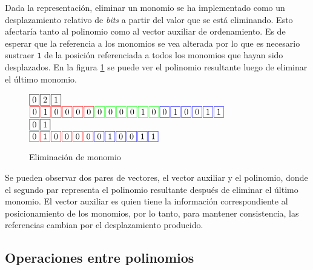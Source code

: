 Dada la representación, eliminar un monomio se ha implementado como un desplazamiento relativo de \textit{bits} a partir del valor que se está eliminando. Esto afectaría tanto al polinomio como al vector auxiliar de ordenamiento. Es de esperar que la referencia a los monomios se vea alterada por lo que es necesario sustraer \texttt{1} de la posición referenciada a todos los monomios que hayan sido desplazados. En la figura \ref{fig:p_e} se puede ver el polinomio resultante luego de eliminar el último monomio.

\begin{figure}
    \centering
    \begin{minipage}[c][3.5cm][b]{.65\textwidth}
    \noindent
    $\fbox{0} \hspace*{.1em} \fbox{2} \hspace*{.1em} \fbox{1}$\ \\
    \noindent
    $\fcolorbox{red}{white}{0} \sep \fcolorbox{red}{white}{1} \sep \fcolorbox{red}{white}{0} \sep \fcolorbox{red}{white}{0} \sep \fcolorbox{red}{white}{0} \sep \fcolorbox{red}{white}{0} \sep \fcolorbox{green}{white}{0} \sep \fcolorbox{green}{white}{0} \sep \fcolorbox{green}{white}{0} \sep \fcolorbox{green}{white}{0} \sep \fcolorbox{green}{white}{1} \sep \fcolorbox{green}{white}{0} \sep \fcolorbox{blue}{white}{0} \sep \fcolorbox{blue}{white}{1} \sep \fcolorbox{blue}{white}{0} \sep \fcolorbox{blue}{white}{0} \sep \fcolorbox{blue}{white}{1} \sep \fcolorbox{blue}{white}{1}$\ \\
    \noindent
    $\fbox{0} \hspace*{.1em} \fbox{1}$\ \\
    \noindent
    $\fcolorbox{red}{white}{0} \sep \fcolorbox{red}{white}{1} \sep \fcolorbox{red}{white}{0} \sep \fcolorbox{red}{white}{0} \sep \fcolorbox{red}{white}{0} \sep \fcolorbox{red}{white}{0} \sep \fcolorbox{blue}{white}{0} \sep \fcolorbox{blue}{white}{1} \sep \fcolorbox{blue}{white}{0} \sep \fcolorbox{blue}{white}{0} \sep \fcolorbox{blue}{white}{1} \sep \fcolorbox{blue}{white}{1}$
    \end{minipage}
\caption{Eliminación de monomio}
\label{fig:p_e}
\end{figure}

Se pueden observar dos pares de vectores, el vector auxiliar y el polinomio, donde el segundo par representa el polinomio resultante después de eliminar el último monomio. El vector auxiliar es quien tiene la información correspondiente al posicionamiento de los monomios, por lo tanto, para mantener consistencia, las referencias cambian por el desplazamiento producido.

\subsection{Operaciones entre polinomios}

